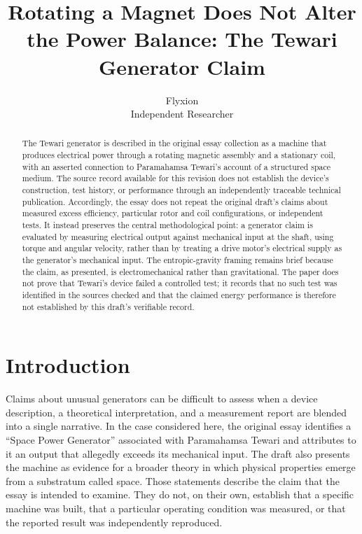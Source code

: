 \documentclass[11pt]{article}
\title{Rotating a Magnet Does Not Alter the Power Balance: The Tewari Generator Claim}
\author{Flyxion \\ \small Independent Researcher}
\date{}
\begin{document}
\maketitle

\begin{abstract}
The Tewari generator is described in the original essay collection as a machine that produces electrical power through a rotating magnetic assembly and a stationary coil, with an asserted connection to Paramahamsa Tewari's account of a structured space medium. The source record available for this revision does not establish the device's construction, test history, or performance through an independently traceable technical publication. Accordingly, the essay does not repeat the original draft's claims about measured excess efficiency, particular rotor and coil configurations, or independent tests. It instead preserves the central methodological point: a generator claim is evaluated by measuring electrical output against mechanical input at the shaft, using torque and angular velocity, rather than by treating a drive motor's electrical supply as the generator's mechanical input. The entropic-gravity framing remains brief because the claim, as presented, is electromechanical rather than gravitational. The paper does not prove that Tewari's device failed a controlled test; it records that no such test was identified in the sources checked and that the claimed energy performance is therefore not established by this draft's verifiable record.
\end{abstract}

\section{Introduction}

Claims about unusual generators can be difficult to assess when a device description, a theoretical interpretation, and a measurement report are blended into a single narrative. In the case considered here, the original essay identifies a ``Space Power Generator'' associated with Paramahamsa Tewari and attributes to it an output that allegedly exceeds its mechanical input. The draft also presents the machine as evidence for a broader theory in which physical properties emerge from a substratum called space. Those statements describe the claim that the essay is intended to examine. They do not, on their own, establish that a specific machine was built, that a particular operating condition was measured, or that the reported result was independently reproduced.
\end{document}
